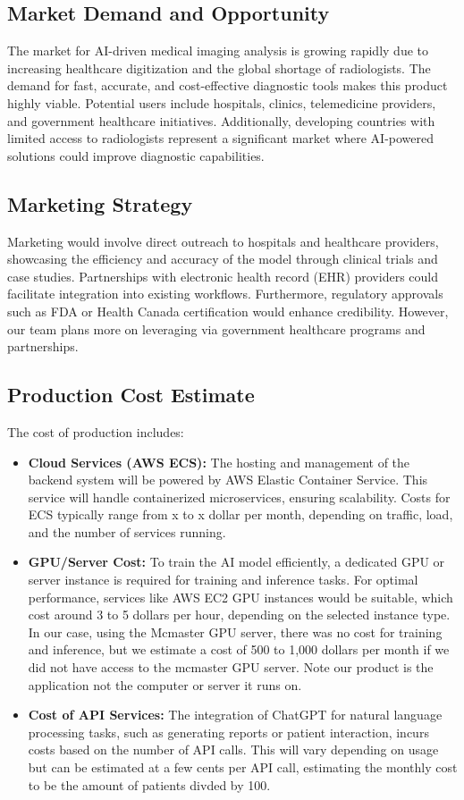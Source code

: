 \documentclass{article}
\begin{document}
\subsection{Market Demand and Opportunity}
The market for AI-driven medical imaging analysis is growing rapidly due to increasing healthcare digitization and the global shortage of radiologists. The demand for fast, accurate, and cost-effective diagnostic tools makes this product highly viable. Potential users include hospitals, clinics, telemedicine providers, and government healthcare initiatives. Additionally, developing countries with limited access to radiologists represent a significant market where AI-powered solutions could improve diagnostic capabilities.

\subsection{Marketing Strategy}
Marketing would involve direct outreach to hospitals and healthcare providers, showcasing the efficiency and accuracy of the model through clinical trials and case studies. Partnerships with electronic health record (EHR) providers could facilitate integration into existing workflows. Furthermore, regulatory approvals such as FDA or Health Canada certification would enhance credibility. However, our team plans more on leveraging via government healthcare programs and partnerships.

\subsection{Production Cost Estimate}
The cost of production includes:
\begin{itemize}
    \item \textbf{Cloud Services (AWS ECS):} The hosting and management of the backend system will be powered by AWS Elastic Container Service. This service will handle containerized microservices, ensuring scalability. Costs for ECS typically range from x to x dollar per month, depending on traffic, load, and the number of services running.
    \item \textbf{GPU/Server Cost:} To train the AI model efficiently, a dedicated GPU or server instance is required for training and inference tasks. For optimal performance, services like AWS EC2 GPU instances would be suitable, which cost around 3 to 5 dollars per hour, depending on the selected instance type. In our case, using the Mcmaster GPU server, there was no cost for training and inference, but we estimate a cost of 500 to 1,000 dollars per month if we did not have access to the mcmaster GPU server. Note our product is the application not the computer or server it runs on.
    \item \textbf{Cost of API Services:} The integration of ChatGPT for natural language processing tasks, such as generating reports or patient interaction, incurs costs based on the number of API calls. This will vary depending on usage but can be estimated at a few cents per API call, estimating the monthly cost to be the amount of patients divded by 100. 
\end{itemize}
\end{document}
